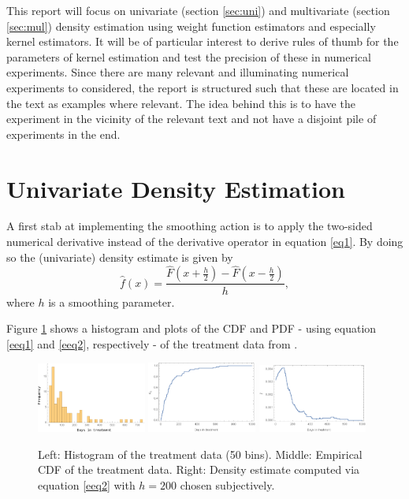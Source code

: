 \newline
This report will focus on univariate (section \eqref{sec:uni}) and multivariate (section \ref{sec:mul}) density estimation using weight function estimators and especially kernel estimators. It will be of particular interest to derive rules of thumb for the parameters of kernel estimation and test the precision of these in numerical experiments. Since there are many relevant and illuminating numerical experiments to considered, the report is structured such that these are located in the text as examples where relevant. The idea behind this is to have the experiment in the vicinity of the relevant text and not have a disjoint pile of experiments in the end.

\section{Univariate Density Estimation}
\label{sec:uni}
\noindent A first stab at implementing the smoothing action is to apply the two-sided numerical derivative instead of the derivative operator in equation \eqref{eq1}. By doing so the (univariate) density estimate is given by
\begin{equation}
	\hat{f}(x)=\frac{\hat{F}(x+\frac{h}{2})-\hat{F}(x-\frac{h}{2})}{h},
	\label{eeq2}
\end{equation} 
where $h$ is a smoothing parameter.
\begin{example}
	\noindent Figure \ref{fig:1a} shows a histogram and plots of the CDF and PDF - using equation \eqref{eeq1} and \eqref{eeq2}, respectively - of the treatment data from \citep{silverman}.
	
	\begin{figure}[H]
		\centering
		\captionsetup{width=0.95\textwidth}
		\includegraphics[width=0.32\textwidth]{figures/P3.pdf}
		\includegraphics[width=0.32\textwidth]{figures/P4.pdf}
		\includegraphics[width=0.32\textwidth]{figures/P5.pdf}
		\caption
		{Left: Histogram of the treatment data (50 bins). Middle: Empirical CDF of the treatment data. Right: Density estimate computed via equation \eqref{eeq2} with $h=200$ chosen subjectively.}
		\label{fig:1a}
	\end{figure}
\end{example}
